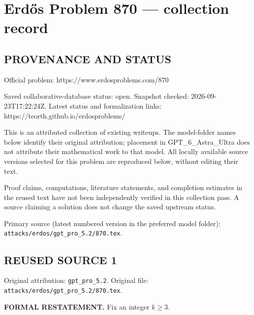 \section*{Erd\H{o}s Problem 870 --- collection record}

\subsection*{PROVENANCE AND STATUS}
Official problem: https://www.erdosproblems.com/870

Saved collaborative-database status: open.
Snapshot checked: 2026-09-23T17:22:24Z.
Latest status and formalization links: https://teorth.github.io/erdosproblems/

This is an attributed collection of existing writeups. The model-folder names below identify their original attribution; placement in GPT\_6\_Astra\_Ultra does not attribute their mathematical work to that model. All locally available source versions selected for this problem are reproduced below, without editing their text.

Proof claims, computations, literature statements, and completion estimates in the reused text have not been independently verified in this collection pass. A source claiming a solution does not change the saved upstream status.

Primary source (latest numbered version in the preferred model folder): \texttt{attacks/erdos/gpt\_pro\_5.2/870.tex}.

\subsection*{REUSED SOURCE 1}
Original attribution: \texttt{gpt\_pro\_5.2}.
Original file: \texttt{attacks/erdos/gpt\_pro\_5.2/870.tex}.


\noindent\textbf{FORMAL RESTATEMENT.}
Fix an integer $k\ge 3$.

